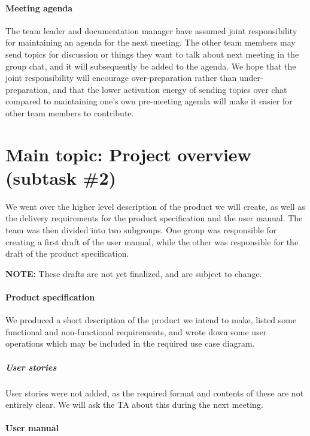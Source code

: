 \documentclass{article}
\begin{document}
\paragraph{Meeting agenda}

The team leader and documentation manager have assumed joint responsibility for maintaining an agenda for the next meeting. The other team members may send topics for discussion or things they want to talk about next meeting in the group chat, and it will subsequently be added to the agenda. We hope that the joint responsibility will encourage over-preparation rather than under-preparation, and that the lower activation energy of sending topics over chat compared to maintaining one's own pre-meeting agenda will make it easier for other team members to contribute.

\section{Main topic: Project overview (subtask \#2)}

We went over the higher level description of the product we will create, as well as the delivery requirements for the product specification and the user manual. The team was then divided into two subgroups. One group was responsible for creating a first draft of the user manual, while the other was responsible for the draft of the product specification.

\mbox{}\newline
\noindent
\textbf{NOTE:} These drafts are not yet finalized, and are subject to change.

\paragraph{Product specification}

We produced a short description of the product we intend to make, listed some functional and non-functional requirements, and wrote down some user operations which may be included in the required use case diagram.

\subparagraph{User stories}

User stories were not added, as the required format and contents of these are not entirely clear. We will ask the TA about this during the next meeting.

\paragraph{User manual}
\end{document}
